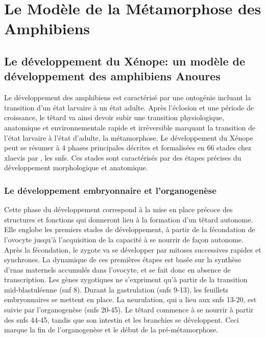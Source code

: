 \documentclass[../main.tex]{subfiles}
\begin{document}
\chapter{Le Modèle de la Métamorphose des Amphibiens}\label{chap:metamorphosis}




\section{Le développement du Xénope: un modèle de développement des amphibiens Anoures}

Le développement des amphibiens est caractérisé par une ontogénie incluant la transition d'un état larvaire à un état adulte.
Après l'éclosion et une période de croissance, le têtard va ainsi devoir subir une transition physiologique, anatomique et environnementale rapide et irréversible marquant la transition de l'état larvaire à l'état d'adulte, la métamorphose.
Le développement du Xénope peut se résumer à 4 phases principales décrites et formalisées en 66 stades chez \gls{xlaevis} par \citet{Nieukoop1956}, les \glspl{snf}.
Ces stades sont caractérisés par des étapes précises du développement morphologique et anatomique.

\subsection{Le développement embryonnaire et l'organogenèse}
Cette phase du développement correspond à la mise en place précoce des structures et fonctions qui donneront lieu à la formation d'un têtard autonome.
Elle englobe les premiers stades de développement, à partir de la fécondation de l'ovocyte jusqu'à l'acquisition de la capacité à se nourrir de façon autonome.
Après la fécondation, le zygote va se développer par mitoses successives rapides et synchrones.
La dynamique de ces premières étapes est basée sur la synthèse d'\glspl{rna} maternels accumulés dans l'ovocyte, et se fait donc en absence de transcription.
Les gènes zygotiques ne s'expriment qu'à partir de la transition mid-blastuléenne (\gls{snf} 8).
Durant la gastrulation (\glspl{snf} 9-13), les feuillets embryonnaires se mettent en place.
La neurulation, qui a lieu aux \glspl{snf} 13-20, est suivie par l'organogenèse (\glspl{snf} 20-45).
Le têtard commence à se nourrir à partir des \glspl{snf} 44-45, tandis que son intestin et les branchies se développent.
Ceci marque la fin de l'organogenèse et le début de la pré-métamorphose.
\end{document}
